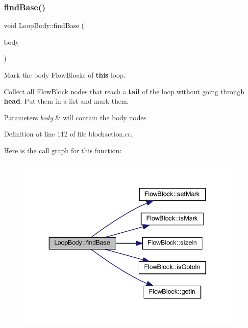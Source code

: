 \subsubsection{\texorpdfstring{findBase()}{findBase()}}
{\footnotesize\ttfamily void Loop\+Body\+::find\+Base (\begin{DoxyParamCaption}\item[{vector$<$ \mbox{\hyperlink{class_flow_block}{Flow\+Block}} $\ast$ $>$ \&}]{body }\end{DoxyParamCaption})}



Mark the body Flow\+Blocks of {\bfseries{this}} loop. 

Collect all \mbox{\hyperlink{class_flow_block}{Flow\+Block}} nodes that reach a {\bfseries{tail}} of the loop without going through {\bfseries{head}}. Put them in a list and mark them. 
\begin{DoxyParams}{Parameters}
{\em body} & will contain the body nodes \\
\hline
\end{DoxyParams}


Definition at line 112 of file blockaction.\+cc.

Here is the call graph for this function\+:
\nopagebreak
\begin{figure}[H]
\begin{center}
\leavevmode
\includegraphics[width=324pt]{class_loop_body_aca6d8a4529165274b791ed9ec37385ef_cgraph}
\end{center}
\end{figure}
\mbox{\label{class_loop_body_a44aa946a133471f9ea5820fab49685f3}} 
